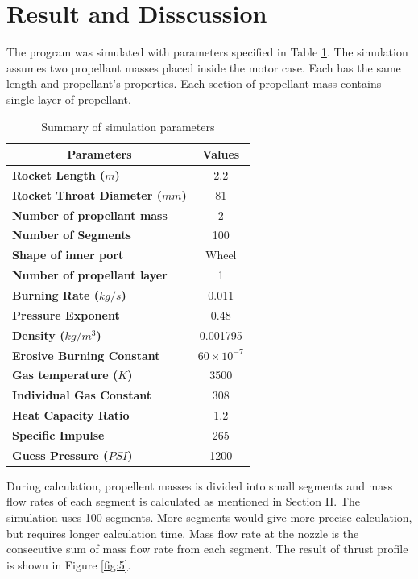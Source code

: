 \documentclass[conference]{IEEEtran}
\begin{document}
\section{Result and Disscussion}
The program was simulated with parameters specified in Table \ref{tab:1}. The simulation assumes two propellant masses placed inside the motor case. Each has the same length and propellant's properties. Each section of propellant mass contains single layer of propellant. 
\begin{table}[h]
  \renewcommand{\arraystretch}{2}
  \renewcommand{\tabcolsep}{1.5mm}
  \centering
  \begin{tabularx}{0.5\textwidth}{|X|X|}
    \hline
    \multicolumn{1}{|c|}{\textbf{Parameters}} &  
    \multicolumn{1}{c|}{\textbf{Values}} \\ \hline
    \textbf{Rocket Length (\(m\))} &  \multicolumn{1}{c|}{2.2} \\ \hline 
    \textbf{Rocket Throat Diameter (\(mm\))} &  \multicolumn{1}{c|}{81} \\ \hline 
    \textbf{Number of propellant mass} &  \multicolumn{1}{c|}{2} \\ \hline 
    \textbf{Number of Segments} &  \multicolumn{1}{c|}{100} \\ \hline 
    \textbf{Shape of inner port} &  \multicolumn{1}{c|}{Wheel} \\ \hline 
    \textbf{Number of propellant layer} &  \multicolumn{1}{c|}{1} \\ \hline 
    \textbf{Burning Rate (\(kg/s\))} &  \multicolumn{1}{c|}{0.011} \\ \hline 
    \textbf{Pressure Exponent} &  \multicolumn{1}{c|}{0.48} \\ \hline 
    \textbf{Density (\(kg/m^{3} \))} &  \multicolumn{1}{c|}{0.001795} \\ \hline 
    \textbf{Erosive Burning Constant} &  \multicolumn{1}{c|}{ \(60 \times 10^{-7}\) } \\ \hline
    \textbf{Gas temperature (\(K\))} &  \multicolumn{1}{c|}{ 3500 } \\ \hline 
    \textbf{Individual Gas Constant} &  \multicolumn{1}{c|}{ 308 } \\ \hline 
    \textbf{Heat Capacity Ratio} &  \multicolumn{1}{c|}{ 1.2 } \\ \hline 
    \textbf{Specific Impulse} &  \multicolumn{1}{c|}{ 265 } \\ \hline 
    \textbf{Guess Pressure (\(PSI\))} &  \multicolumn{1}{c|}{ 1200 } \\ \hline 
  \end{tabularx}
  \space
  \caption{Summary of simulation parameters}
  \label{tab:1}
\end{table}
During calculation, propellent masses is divided into small segments and mass flow rates of each segment is calculated as mentioned in Section II. The simulation uses 100 segments. More segments would give more precise calculation, but requires longer calculation time. Mass flow rate at the nozzle is the consecutive sum of mass flow rate from each segment. The result of thrust profile is shown in Figure {\ref{fig:5}}. 
\end{document}
